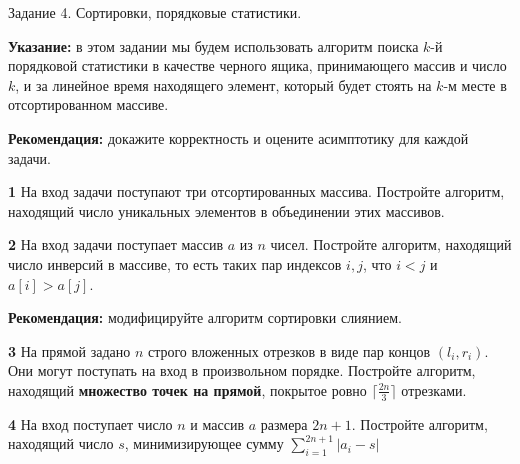 \documentclass{article}
\begin{document}
\begin{center}
\Large {Задание 4. Сортировки, порядковые статистики.}
\end{center}

\bigskip

\textbf{Указание:} в этом задании мы будем использовать алгоритм поиска $k$-й порядковой статистики в качестве черного ящика, принимающего массив и число $k$, и за линейное время находящего элемент, который будет стоять на $k$-м месте в отсортированном массиве.

\medskip

\textbf{Рекомендация:} докажите корректность и оцените асимптотику для каждой задачи.

\medskip

\textbf{1} На вход задачи поступают три отсортированных массива. Постройте алгоритм, находящий число уникальных элементов в объединении этих массивов.

\medskip

\textbf{2} На вход задачи поступает массив $a$ из $n$ чисел. Постройте алгоритм, находящий число инверсий в массиве, то есть таких пар индексов $i, j$, что $i < j$ и $a[i] > a[j]$.

\textbf{Рекомендация:} модифицируйте алгоритм сортировки слиянием.

\medskip

\textbf{3} На прямой задано $n$ строго вложенных отрезков в виде пар концов $(l_i, r_i)$. Они могут поступать на вход в произвольном порядке. Постройте алгоритм, находящий \textbf{множество точек на прямой}, покрытое ровно $\lceil \frac{2n}{3} \rceil$ отрезками.

\medskip

\textbf{4} На вход поступает число $n$ и массив $a$ размера $2n + 1$. Постройте алгоритм, находящий число $s$, минимизирующее сумму $\sum\limits_{i=1}^{2n+1} |a_i - s|$
\end{document}
